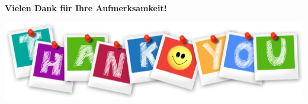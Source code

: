\miniframesoff
\section{}

\begin{frame}%
    \textbf{Vielen Dank für Ihre Aufmerksamkeit!}
    \medskip

    \includegraphics[keepaspectratio, width=.75\textwidth]{include/thank-you.png}
\end{frame}

\miniframeson
